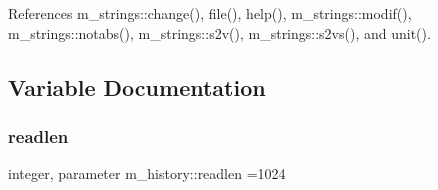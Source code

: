 References m\+\_\+strings\+::change(), file(), help(), m\+\_\+strings\+::modif(), m\+\_\+strings\+::notabs(), m\+\_\+strings\+::s2v(), m\+\_\+strings\+::s2vs(), and unit().



\subsection{Variable Documentation}
\mbox{\label{namespacem__history_aca543c267d8b80d0690c33e4a684143b}} 
\subsubsection{\texorpdfstring{readlen}{readlen}}
{\footnotesize\ttfamily integer, parameter m\+\_\+history\+::readlen =1024\hspace{0.3cm}{\ttfamily [private]}}

